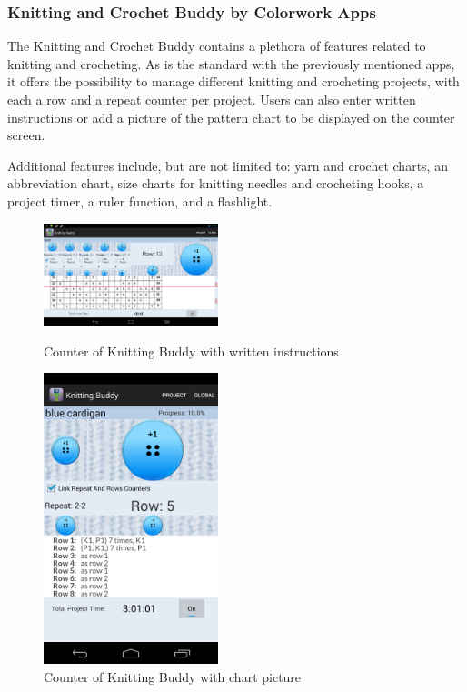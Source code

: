 \subsubsection*{Knitting and Crochet Buddy by Colorwork Apps}
The Knitting and Crochet Buddy contains a plethora of features related to knitting and crocheting. As is the standard with the previously mentioned apps, it offers the possibility to manage different knitting and crocheting projects, with each a row and a repeat counter per project. Users can also enter written instructions or add a picture of the pattern chart to be displayed on the counter screen.

Additional features include, but are not limited to: yarn and crochet charts, an abbreviation chart, size charts for knitting needles and crocheting hooks, a project timer, a ruler function, and a flashlight.

\begin{figure}[H]
\centering
\begin{minipage}{.5\textwidth}
  \centering
  \includegraphics[width=2in]{images/image04.png}
  \caption[Counter of Knitting Buddy with written instructions ]{Counter of Knitting Buddy with written instructions}
  \label{fig_knittingbuddy1}
\end{minipage}%
\begin{minipage}{.5\textwidth}
  \centering
  \includegraphics[width=2in]{images/image05.png}
  \caption[Counter of Knitting Buddy with chart picture ]{Counter of Knitting Buddy with chart picture}
  \label{fig_knittingbuddy}
\end{minipage}
\end{figure}

